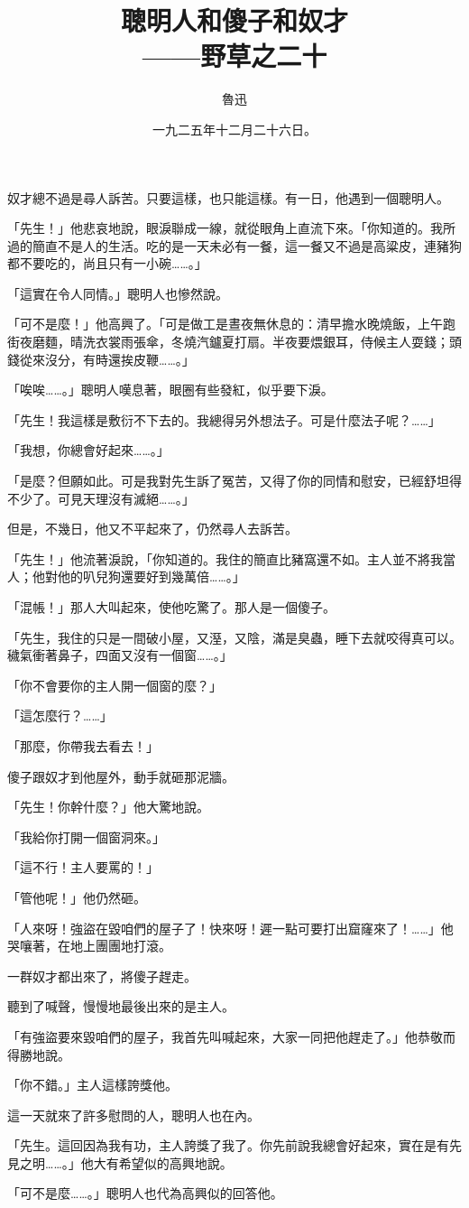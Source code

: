 \documentclass[a5j,12pt]{ltjtarticle}
\title{\gtfamily 聰明人和傻子和奴才 \\[1em]
\hfil\normalsize\mcfamily ——野草之二十\hspace*{-3\zw}}
\author{\small\kai 魯迅}
\date{}
\newif\ifadobe
\newcommand*{\vcolon}{\ifadobe：\else\hbox{\yoko：}\fi}
\newcommand*{\vscolon}{\ifadobe；\else\hbox{\yoko；}\fi}
\begin{document}
\maketitle

奴才總不過是尋人訴苦。只要這樣，也只能這樣。有一日，他遇到一個聰明人。

「先生！」他悲哀地說，眼淚聯成一線，就從眼角上直流下來。「你知道的。我所過的簡直不是人的生活。吃的是一天未必有一餐，這一餐又不過是高粱皮，連豬狗都不要吃的，尚且只有一小碗……。」

「這實在令人同情。」聰明人也慘然說。

「可不是麼！」他高興了。「可是做工是晝夜無休息的\vcolon{}清早擔水晚燒飯，上午跑街夜磨麵，晴洗衣裳雨張傘，冬燒汽鑪夏打扇。半夜要煨銀耳，侍候主人耍錢\vscolon{}頭錢從來沒分，有時還挨皮鞭……。」

「唉唉……。」聰明人嘆息著，眼圈有些發紅，似乎要下淚。

「先生！我這樣是敷衍不下去的。我總得另外想法子。可是什麼法子呢？……」

「我想，你總會好起來……。」

「是麼？但願如此。可是我對先生訴了冤苦，又得了你的同情和慰安，已經舒坦得不少了。可見天理沒有滅絕……。」

\bigskip

但是，不幾日，他又不平起來了，仍然尋人去訴苦。

「先生！」他流著淚說，「你知道的。我住的簡直比豬窩還不如。主人並不將我當人\vscolon{}他對他的叭兒狗還要好到幾萬倍……。」

「混帳！」那人大叫起來，使他吃驚了。那人是一個傻子。

「先生，我住的只是一間破小屋，又溼，又陰，滿是臭蟲，睡下去就咬得真可以。穢氣衝著鼻子，四面又沒有一個窗……。」

「你不會要你的主人開一個窗的麼？」

「這怎麼行？……」

「那麼，你帶我去看去！」

傻子跟奴才到他屋外，動手就砸那泥牆。

「先生！你幹什麼？」他大驚地說。

「我給你打開一個窗洞來。」

「這不行！主人要罵的！」

「管他呢！」他仍然砸。

「人來呀！強盜在毀咱們的屋子了！快來呀！遲一點可要打出窟窿來了！……」他哭嚷著，在地上團團地打滾。

一群奴才都出來了，將傻子趕走。

聽到了喊聲，慢慢地最後出來的是主人。

「有強盜要來毀咱們的屋子，我首先叫喊起來，大家一同把他趕走了。」他恭敬而得勝地說。

「你不錯。」主人這樣誇獎他。

\bigskip

這一天就來了許多慰問的人，聰明人也在內。

「先生。這回因為我有功，主人誇獎了我了。你先前說我總會好起來，實在是有先見之明……。」他大有希望似的高興地說。

「可不是麼……。」聰明人也代為高興似的回答他。

\bigskip

 \date{一九二五年十二月二十六日。}
\end{document}
